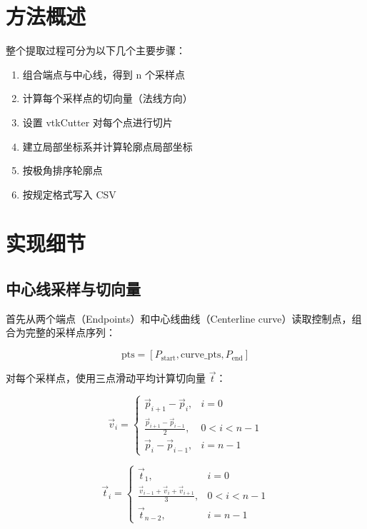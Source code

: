 \documentclass[12pt,a4paper]{article}
\begin{document}
\section{方法概述}

整个提取过程可分为以下几个主要步骤：

\begin{enumerate}
  \item 组合端点与中心线，得到 n 个采样点
  \item 计算每个采样点的切向量（法线方向）
  \item 设置 vtkCutter 对每个点进行切片
  \item 建立局部坐标系并计算轮廓点局部坐标
  \item 按极角排序轮廓点
  \item 按规定格式写入 CSV
\end{enumerate}

\section{实现细节}

\subsection{中心线采样与切向量}

首先从两个端点（Endpoints）和中心线曲线（Centerline curve）读取控制点，组合为完整的采样点序列：

\begin{equation}
\text{pts} = [P_{\text{start}}, \text{curve\_pts}, P_{\text{end}}]
\end{equation}

对每个采样点，使用三点滑动平均计算切向量 $\vec{t}$：

\begin{equation}
\vec{v}_i = 
\begin{cases}
\vec{p}_{i+1} - \vec{p}_i, & i = 0 \\
\frac{\vec{p}_{i+1} - \vec{p}_{i-1}}{2}, & 0 < i < n-1 \\
\vec{p}_i - \vec{p}_{i-1}, & i = n-1
\end{cases}
\end{equation}

\begin{equation}
\vec{t}_i = 
\begin{cases}
\vec{t}_1, & i = 0 \\
\frac{\vec{v}_{i-1} + \vec{v}_i + \vec{v}_{i+1}}{3}, & 0 < i < n-1 \\
\vec{t}_{n-2}, & i = n-1
\end{cases}
\end{equation}
\end{document}

